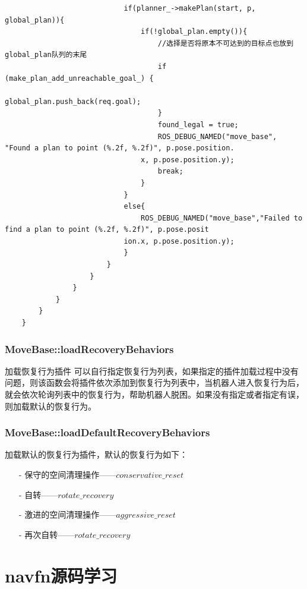 \documentclass[9pt, oneside]{book}
\begin{document}
\begin{verbatim}
                            if(planner_->makePlan(start, p, global_plan)){
                                if(!global_plan.empty()){
                                    //选择是否将原本不可达到的目标点也放到global_plan队列的末尾
                                    if (make_plan_add_unreachable_goal_) {
                                        global_plan.push_back(req.goal);
                                    }
                                    found_legal = true;
                                    ROS_DEBUG_NAMED("move_base", "Found a plan to point (%.2f, %.2f)", p.pose.position.
                                x, p.pose.position.y);
                                    break;
                                }
                            }
                            else{
                                ROS_DEBUG_NAMED("move_base","Failed to find a plan to point (%.2f, %.2f)", p.pose.posit
                            ion.x, p.pose.position.y);
                            }
                        }
                    }
                }
            }
        }
    }
\end{verbatim}
\normalsize

\subsubsection{MoveBase::loadRecoveryBehaviors}

加载恢复行为插件 可以自行指定恢复行为列表，如果指定的插件加载过程中没有问题，则该函数会将插件依次添加到恢复行为列表中，当机器人进入恢复行为后，就会依次轮询列表中的恢复行为，帮助机器人脱困。如果没有指定或者指定有误，则加载默认的恢复行为。

\subsubsection{MoveBase::loadDefaultRecoveryBehaviors}

加载默认的恢复行为插件，默认的恢复行为如下：

\begin{itemize}
    \item [-] 保守的空间清理操作——$conservative\_reset$
    \item [-] 自转——$rotate\_recovery$
    \item [-] 激进的空间清理操作——$aggressive\_reset$
    \item [-] 再次自转——$rotate\_recovery$
\end{itemize}

\section{navfn源码学习}
\end{document}
